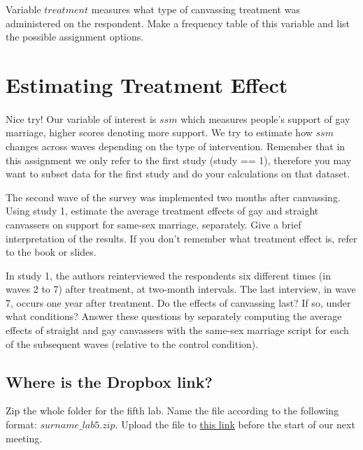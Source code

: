\documentclass{article}\usepackage[]{graphicx}\usepackage[]{color}
\begin{document}
Variable $treatment$ measures what type of canvassing treatment was administered on the respondent. Make a frequency table of this variable and list the possible assignment options.


\section*{Estimating Treatment Effect}
\paragraph{}

Nice try! Our variable of interest is $ssm$ which measures people's support of gay marriage, higher scores denoting more support. We try to estimate how $ssm$ changes across waves depending on the type of intervention. Remember that in this assignment we only refer to the first study (study == 1), therefore you may want to subset data for the first study and do your calculations on that dataset.

The second wave of the survey was implemented two months after canvassing. Using study 1, estimate the average treatment effects of gay and straight canvassers on support for same-sex marriage, separately. Give a brief interpretation of the results. If you don't remember what treatment effect is, refer to the book or slides.

In study 1, the authors reinterviewed the respondents six different times (in waves 2 to 7) after treatment, at two-month intervals. The last interview, in wave 7, occurs one year after treatment. Do the effects of canvassing last? If so, under what conditions? Answer these questions by separately computing the average effects of straight and gay canvassers with the same-sex marriage script for each of the subsequent waves (relative to the control condition).

\subsection*{Where is the Dropbox link?}

Zip the whole folder for the fifth lab. Name the file according to the following format: $surname\_lab5.zip$. Upload the file to \href{https://www.dropbox.com/request/BuKoKCJDOZPZg221ZCJG}{this link} before the start of our next meeting.
\end{document}
